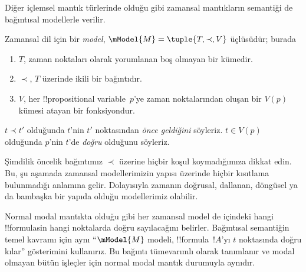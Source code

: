 Diğer içlemsel mantık türlerinde olduğu gibi zamansal mantıkların semantiği
de bağıntısal modellerle verilir.

\begin{defn}
  Zamansal dil için bir \emph{model}, $\mModel{M}=\tuple{T,\prec,V}$
  üçlüsüdür; burada
  \begin{enumerate}
  \item $T$, zaman noktaları olarak yorumlanan boş olmayan bir kümedir.
  \item $\prec$, $T$ üzerinde ikili bir bağıntıdır.
  \item $V$, her !!{propositional variable}~$p$'ye zaman noktalarından oluşan
    bir $V(p)$ kümesi atayan bir fonksiyondur.
  \end{enumerate}
  $t\prec t'$ olduğunda $t$'nin $t'$ noktasından \emph{önce geldiğini} söyleriz.
  $t\in V(p)$ olduğunda $p$'nin $t$'de \emph{doğru} olduğunu söyleriz.
\end{defn}

Şimdilik öncelik bağıntımız $\prec$ üzerine hiçbir koşul koymadığımıza
dikkat edin. Bu, şu aşamada zamansal modellerimizin yapısı üzerinde hiçbir
kısıtlama bulunmadığı anlamına gelir. Dolayısıyla zamanın doğrusal,
dallanan, döngüsel ya da bambaşka bir yapıda olduğu modellerimiz olabilir.

Normal modal mantıkta olduğu gibi her zamansal model de içindeki hangi
!!{formula}s{}in hangi noktalarda doğru sayılacağını belirler. Bağıntısal
semantiğin temel kavramı için aynı ``$\mModel{M}$ modeli, !!{formula}~$!A$'yı
$t$ noktasında doğru kılar'' gösterimini kullanırız. Bu bağıntı tümevarımlı
olarak tanımlanır ve modal olmayan bütün işleçler için normal modal mantık
durumuyla aynıdır.

